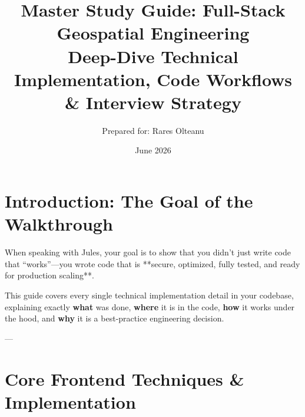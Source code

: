 \documentclass[11pt]{article}
\title{\textbf{Master Study Guide: Full-Stack Geospatial Engineering}\\
\large Deep-Dive Technical Implementation, Code Workflows \& Interview Strategy}
\author{Prepared for: Rares Olteanu}
\date{June 2026}
\begin{document}
\maketitle
\newpage
\tableofcontents
\newpage

\section{Introduction: The Goal of the Walkthrough}
When speaking with Jules, your goal is to show that you didn't just write code that ``works''---you wrote code that is **secure, optimized, fully tested, and ready for production scaling**.

This guide covers every single technical implementation detail in your codebase, explaining exactly \textbf{what} was done, \textbf{where} it is in the code, \textbf{how} it works under the hood, and \textbf{why} it is a best-practice engineering decision.

---

\section{Core Frontend Techniques \& Implementation}
\end{document}
